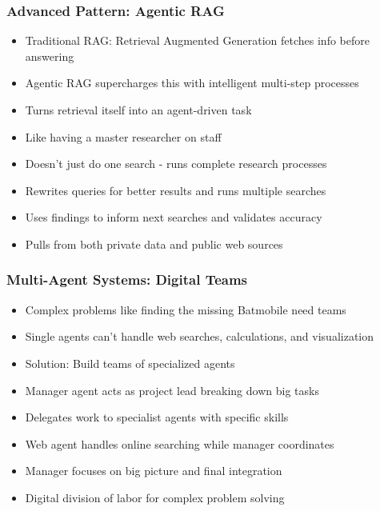 \begin{frame}[fragile]\frametitle{Advanced Pattern: Agentic RAG}
      \begin{itemize}
        \item Traditional RAG: Retrieval Augmented Generation fetches info before answering
        \item Agentic RAG supercharges this with intelligent multi-step processes
        \item Turns retrieval itself into an agent-driven task
        \item Like having a master researcher on staff
        \item Doesn't just do one search - runs complete research processes
        \item Rewrites queries for better results and runs multiple searches
        \item Uses findings to inform next searches and validates accuracy
        \item Pulls from both private data and public web sources
      \end{itemize}
\end{frame}

\begin{frame}[fragile]\frametitle{Multi-Agent Systems: Digital Teams}
      \begin{itemize}
        \item Complex problems like finding the missing Batmobile need teams
        \item Single agents can't handle web searches, calculations, and visualization
        \item Solution: Build teams of specialized agents
        \item Manager agent acts as project lead breaking down big tasks
        \item Delegates work to specialist agents with specific skills
        \item Web agent handles online searching while manager coordinates
        \item Manager focuses on big picture and final integration
        \item Digital division of labor for complex problem solving
      \end{itemize}
\end{frame}

